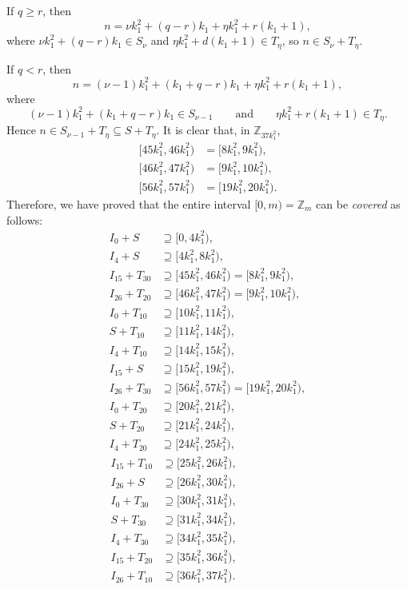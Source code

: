 \documentclass[11pt]{article}
\theoremstyle{definition}
\def\Z{\mbox{$\mathbb Z$}}
\begin{document}
If $q \geq r$, then
\[
n = \nu k_1^2 + (q - r) k_1+\eta k_1^2 + r(k_1 + 1), 
\]
where $\nu k_1^2 + (q - r)k_1 \in S_\nu$ and $\eta k_1^2 + d(k_1 + 1) \in T_\eta$, so $n \in S_\nu +T_\eta$. 

If $q <r$, then
\[
n = (\nu  - 1)k_1^2 + (k_1 + q - r) k_1+\eta k_1^2 + r(k_1 + 1), 
\]
where 
\[
(\nu  - 1)k_1^2 + (k_1 + q - r)k_1 \in S_{\nu  - 1}\qquad\text{and}\qquad
\eta k_1^2 + r(k_1 + 1) \in T_\eta.
\]
Hence $n \in S_{\nu-1}+T_\eta\subseteq S+T_{\eta}$. 
It is clear that, in $\Z_{37k_{1}^{2}}$,
\begin{align*}
[45k_{1}^{2},46k_{1}^{2})&=[8k_1^2, 9k_1^2),\\
[46k_{1}^{2},47k_{1}^{2})&=[9k_1^2, 10k_1^2),\\
[56k_{1}^{2},57k_{1}^{2})&=[19k_1^2, 20k_1^2).
\end{align*}
Therefore, we have proved that the entire interval $[0, m)=\Z_{m}$ can be  {\em covered\/} as follows: 
\begin{align*}
I_0 + S  &\supseteq [0, 4k_1^2),\\
I_4 + S  &\supseteq [4k_1^2, 8k_1^2),\\
I_{15} + T_{30}  &\supseteq[45k_{1}^{2},46k_{1}^{2})= [8k_1^2, 9k_1^2),\\
I_{26} + T_{20}  &\supseteq[46k_{1}^{2},47k_{1}^{2})= [9k_1^2, 10k_1^2),\\
I_{0}+T_{10}  &\supseteq [10k_1^2, 11k_1^2),\\
S+T_{10}  &\supseteq [11k_1^2, 14k_1^2),\\
I_{4} + T_{10}  &\supseteq [14k_1^2, 15k_1^2),\\
I_{15} + S  &\supseteq [15k_1^2, 19k_1^2),\\
I_{26} + T_{30}  &\supseteq[56k_{1}^{2},57k_{1}^{2})= [19k_1^2, 20k_1^2),\\
I_{0} + T_{20}  &\supseteq [20k_1^2, 21k_1^2),\\
S + T_{20}  &\supseteq [21k_1^2, 24k_1^2),\\
I_{4} + T_{20}  &\supseteq [24k_1^2, 25k_1^2),
\end{align*}
\begin{align*}
I_{15} + T_{10}  &\supseteq [25k_1^2, 26k_1^2),\\
I_{26} + S  &\supseteq [26k_1^2, 30k_1^2),\\
I_{0} + T_{30}  &\supseteq [30k_1^2, 31k_1^2),\\
S + T_{30}  &\supseteq [31k_1^2, 34k_1^2),\\
I_{4} + T_{30}  &\supseteq [34k_1^2, 35k_1^2),\\
I_{15} + T_{20}  &\supseteq [35k_1^2, 36k_1^2),\\
I_{26} + T_{10}  &\supseteq [36k_1^2, 37k_1^2).\qquad\qquad\qquad\ 
\end{align*}
\end{document}
